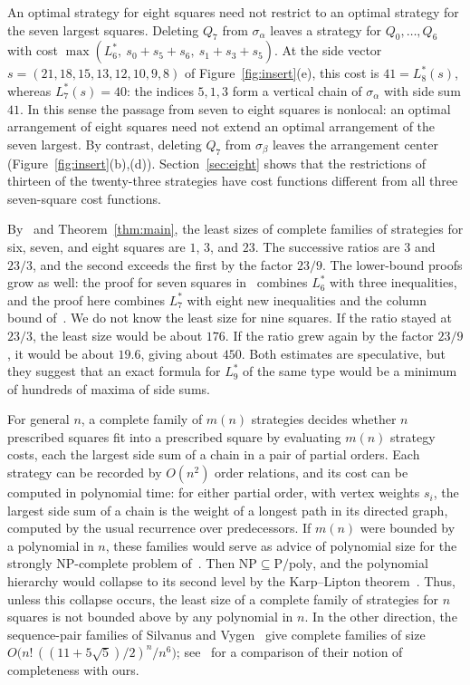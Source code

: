 \documentclass[12pt]{amsart}
\theoremstyle{definition}
\theoremstyle{remark}
\numberwithin{equation}{section}
\numberwithin{figure}{section}
\numberwithin{table}{section}
\newcommand{\st}[1]{\mathrm{#1}}
\begin{document}
An optimal strategy for eight squares need not restrict to an optimal
strategy for the seven largest squares. Deleting $Q_7$ from $\sigma_\alpha$
leaves a strategy for $Q_0,\ldots,Q_6$ with cost
$\max(L_6^*,\ s_0+s_5+s_6,\ s_1+s_3+s_5)$. At the side vector
$s=(21,18,15,13,12,10,9,8)$ of Figure~\ref{fig:insert}(e), this cost is
$41=L_8^*(s)$, whereas $L_7^*(s)=40$: the indices $5,1,3$ form a vertical
chain of $\sigma_\alpha$ with side sum $41$. In this sense the passage from
seven to eight squares is nonlocal: an optimal arrangement of eight squares
need not extend an optimal arrangement of the seven largest. By contrast,
deleting $Q_7$ from $\sigma_\beta$ leaves the arrangement $\st{center}$
(Figure~\ref{fig:insert}(b),(d)). Section~\ref{sec:eight} shows that the
restrictions of thirteen of the twenty-three strategies have cost functions
different from all three seven-square cost functions.

By~\cite[Theorem~6.2]{BadgerSeven} and Theorem~\ref{thm:main}, the least
sizes of complete families of strategies for six, seven, and eight squares
are $1$, $3$, and $23$. The successive ratios are $3$ and $23/3$, and the
second exceeds the first by the factor $23/9$. The lower-bound proofs grow
as well: the proof for seven squares in~\cite{BadgerSeven} combines $L_6^*$
with three inequalities, and the proof here combines $L_7^*$ with eight new
inequalities and the column bound of~\cite{BadgerSeven}. We do
not know the least size for nine squares. If the ratio stayed at $23/3$, the
least size would be about $176$. If the ratio grew again by
the factor $23/9$, it would be about $19.6$, giving about $450$. Both estimates are speculative, but they suggest that an exact
formula for $L_9^*$ of the same type would be a minimum of hundreds of
maxima of side sums.

For general $n$, a complete family of $m(n)$
strategies decides whether $n$ prescribed squares fit into a prescribed
square by evaluating $m(n)$ strategy costs, each the largest side sum of a
chain in a pair of partial orders. Each strategy can be recorded by $O(n^2)$
order relations, and its cost can be computed in polynomial time: for either
partial order, with vertex weights $s_i$, the largest side sum of a chain is
the weight of a longest path in its directed graph, computed by the usual
recurrence over predecessors. If $m(n)$ were bounded by a polynomial in
$n$, these families would serve as advice of polynomial size for the
strongly NP-complete problem of~\cite{Leung90}. Then
$\mathrm{NP}\subseteq\mathrm{P/poly}$, and the polynomial hierarchy would
collapse to its second level by the Karp--Lipton
theorem~\cite{KarpLipton82}. Thus, unless this collapse occurs, the least size of a complete family of strategies for
$n$ squares is not bounded above by any polynomial in $n$. In the other
direction, the sequence-pair
families of Silvanus and Vygen~\cite{SilvanusVygen20} give complete families
of size $O\bigl(n!\,((11+5\sqrt5)/2)^n/n^6\bigr)$; see~\cite{BadgerSeven}
for a comparison of their notion of completeness with ours.
\end{document}
